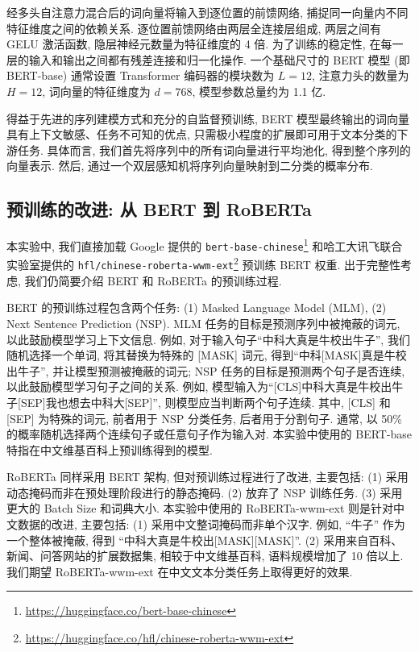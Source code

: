\documentclass[12pt,a4paper]{article}
\begin{document}
经多头自注意力混合后的词向量将输入到逐位置的前馈网络, 捕捉同一向量内不同特征维度之间的依赖关系. 逐位置前馈网络由两层全连接层组成, 两层之间有 GELU 激活函数, 隐层神经元数量为特征维度的 4 倍. 为了训练的稳定性, 在每一层的输入和输出之间都有残差连接和归一化操作. 一个基础尺寸的 BERT 模型 (即 BERT-base) 通常设置 Transformer 编码器的模块数为 $L = 12$, 注意力头的数量为 $H = 12$, 词向量的特征维度为 $d = 768$, 模型参数总量约为 1.1 亿.

得益于先进的序列建模方式和充分的自监督预训练, BERT 模型最终输出的词向量具有上下文敏感、任务不可知的优点, 只需极小程度的扩展即可用于文本分类的下游任务. 具体而言, 我们首先将序列中的所有词向量进行平均池化, 得到整个序列的向量表示. 然后, 通过一个双层感知机将序列向量映射到二分类的概率分布.

\subsection{预训练的改进: 从 BERT 到 RoBERTa}

本实验中, 我们直接加载 Google 提供的 \texttt{bert-base-chinese}\footnote{\url{https://huggingface.co/bert-base-chinese}} 和哈工大讯飞联合实验室提供的 \texttt{hfl/chinese-roberta-wwm-ext}\footnote{\url{https://huggingface.co/hfl/chinese-roberta-wwm-ext}} 预训练 BERT 权重. 出于完整性考虑, 我们仍简要介绍 BERT 和 RoBERTa 的预训练过程.

BERT 的预训练过程包含两个任务: (1) Masked Language Model (MLM), (2) Next Sentence Prediction (NSP). MLM 任务的目标是预测序列中被掩蔽的词元, 以此鼓励模型学习上下文信息. 例如, 对于输入句子“中科大真是牛校出牛子”, 我们随机选择一个单词, 将其替换为特殊的 [MASK] 词元, 得到“中科[MASK]真是牛校出牛子”, 并让模型预测被掩蔽的词元; NSP 任务的目标是预测两个句子是否连续, 以此鼓励模型学习句子之间的关系. 例如, 模型输入为“[CLS]中科大真是牛校出牛子[SEP]我也想去中科大[SEP]”, 则模型应当判断两个句子连续. 其中, [CLS] 和 [SEP] 为特殊的词元, 前者用于 NSP 分类任务, 后者用于分割句子. 通常, 以 50\% 的概率随机选择两个连续句子或任意句子作为输入对. 本实验中使用的 BERT-base 特指在中文维基百科上预训练得到的模型.

RoBERTa 同样采用 BERT 架构, 但对预训练过程进行了改进, 主要包括: (1) 采用动态掩码而非在预处理阶段进行的静态掩码. (2) 放弃了 NSP 训练任务. (3) 采用更大的 Batch Size 和词典大小. 本实验中使用的 RoBERTa-wwm-ext 则是针对中文数据的改进, 主要包括: (1) 采用中文整词掩码而非单个汉字. 例如, “牛子” 作为一个整体被掩蔽, 得到 “中科大真是牛校出[MASK][MASK]”. (2) 采用来自百科、新闻、问答网站的扩展数据集, 相较于中文维基百科, 语料规模增加了 10 倍以上. 我们期望 RoBERTa-wwm-ext 在中文文本分类任务上取得更好的效果.
\end{document}
